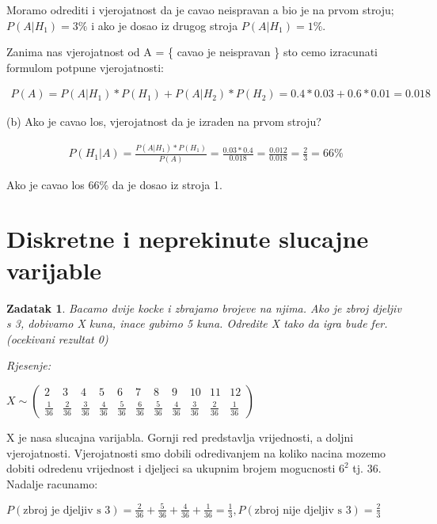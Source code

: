 \documentclass{report}
\newcommand{\rjesenje}{\begin{flushleft}\it Rjesenje:\end{flushleft}}
\newcommand{\onespace}{\vspace{1pc}}
\theoremstyle{plain}
\newtheorem{thm}{Zadatak}[chapter] %
\begin{document}
\newpage

Moramo odrediti i vjerojatnost da je cavao neispravan a bio je na prvom stroju; 
$P(A|H_1)=3\%$ i ako je dosao iz drugog stroja $P(A|H_1)=1\%$.

\onespace

Zanima nas vjerojatnost od A = \{ cavao je neispravan \} sto cemo izracunati formulom
potpune vjerojatnosti:

\begin{align*}
    P(A) = P(A|H_1) * P(H_1) + P(A|H_2) * P(H_2) = 0.4 * 0.03 + 0.6 * 0.01 = 0.018
\end{align*}

\onespace

(b) Ako je cavao los, vjerojatnost da je izraden na prvom stroju?

\begin{align*}
    P(H_1|A) = \frac{P(A|H_1) * P(H_1)}{P(A)} = \frac{0.03 * 0.4}{0.018} = \frac{0.012}{0.018} = \frac{2}{3} = 66\%
\end{align*}

Ako je cavao los 66\% da je dosao iz stroja 1.

\section{Diskretne i neprekinute slucajne varijable}
\onespace
\begin{thm}Bacamo dvije kocke i zbrajamo brojeve na njima. Ako je zbroj djeljiv s 3, 
    dobivamo X kuna, inace gubimo 5 kuna. Odredite X tako da igra bude fer. 
    (ocekivani rezultat 0)\end{thm} 
\rjesenje

$X \sim \begin{pmatrix}2& 3& 4& 5& 6& 7& 8& 9& 10& 11& 12 \\ \frac{1}{36}& \frac{2}{36}& \frac{3}{36}& \frac{4}{36}& \frac{5}{36}& \frac{6}{36}& \frac{5}{36}& \frac{4}{36}& \frac{3}{36}& \frac{2}{36}& \frac{1}{36} \end{pmatrix} $

\onespace

X je nasa slucajna varijabla. Gornji red predstavlja vrijednosti, a doljni vjerojatnosti.
Vjerojatnosti smo dobili odredivanjem na koliko nacina mozemo dobiti odredenu vrijednost
i djeljeci sa ukupnim brojem mogucnosti $6^2$ tj. 36. Nadalje racunamo:

\onespace

$P(\text{zbroj je djeljiv s 3})=\frac{2}{36}+\frac{5}{36}+\frac{4}{36}+\frac{1}{36}=\frac{1}{3},
P(\text{zbroj nije djeljiv s 3})=\frac{2}{3}$
\end{document}
